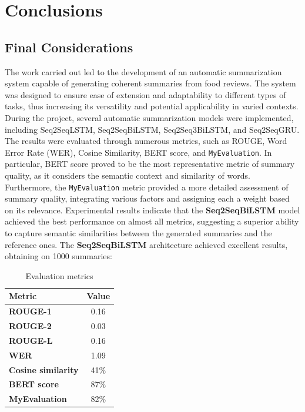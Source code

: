 \section{Conclusions}
\subsection{Final Considerations}
The work carried out led to the development of an automatic summarization system capable of generating coherent summaries from food reviews. The system was designed to ensure ease of extension and adaptability to different types of tasks, thus increasing its versatility and potential applicability in varied contexts.\\
During the project, several automatic summarization models were implemented, including Seq2SeqLSTM, Seq2SeqBiLSTM, Seq2Seq3BiLSTM, and Seq2SeqGRU.
The results were evaluated through numerous metrics, such as ROUGE, Word Error Rate (WER), Cosine Similarity, BERT score, and \texttt{MyEvaluation}. In particular,
BERT score proved to be the most representative metric of summary quality, as it considers the semantic context and similarity of words.\\

Furthermore, the \texttt{MyEvaluation} metric provided a more detailed assessment of summary quality, integrating various factors and assigning each a weight based on its relevance. Experimental results indicate that the \textbf{Seq2SeqBiLSTM} model achieved the best performance on almost all metrics,
suggesting a superior ability to capture semantic similarities between the generated summaries and the reference ones.
The \textbf{Seq2SeqBiLSTM} architecture achieved excellent results, obtaining on 1000 summaries:
\begin{table}[ht]
    \centering
    \begin{tabular}{@{} >{\bfseries}l c @{}}
        \toprule
        \textbf{Metric}    & \textbf{Value} \\
        \midrule
        ROUGE-1             & 0.16            \\
        ROUGE-2             & 0.03            \\
        ROUGE-L             & 0.16            \\
        WER                 & 1.09            \\
        Cosine similarity   & 41\%            \\
        BERT score           & 87\%            \\
        MyEvaluation        & 82\%            \\
        \bottomrule
    \end{tabular}
    \caption{Evaluation metrics}
\end{table}


